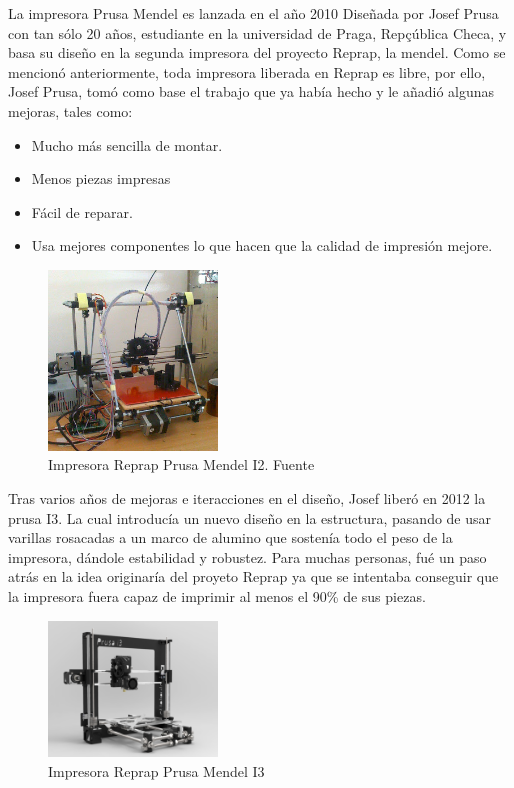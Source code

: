 La impresora Prusa Mendel es lanzada en el año 2010 Diseñada por Josef Prusa con tan sólo 20 años, estudiante en la universidad de Praga, Repçública Checa, y basa su diseño
en la segunda impresora del proyecto Reprap, la mendel. Como se mencionó anteriormente, toda impresora liberada en Reprap es libre, por ello, Josef Prusa, tomó como base el trabajo que ya había hecho y le añadió algunas mejoras, tales como:
\begin{itemize}
    \item Mucho más sencilla de montar.
    \item Menos piezas impresas
    \item Fácil de reparar.
    \item Usa mejores componentes lo que hacen que la calidad de impresión mejore.
\end{itemize}

\begin{figure}[H]
        \centering
        \includegraphics[width=0.4\textwidth]{images/prusa_i2.jpg}
        \caption{Impresora Reprap Prusa Mendel I2. Fuente \cite{prusai2}}
        \label{fig:estado_i2}
\end{figure}

Tras varios años de mejoras e iteracciones en el diseño, Josef liberó en 2012 la prusa I3. La cual introducía un nuevo diseño en la estructura, pasando de usar varillas rosacadas a un marco de alumino que sostenía todo el peso de la impresora, dándole estabilidad y robustez. Para muchas personas, fué un paso atrás en la idea originaría del proyeto Reprap ya que se intentaba conseguir que la impresora fuera capaz de imprimir al menos el 90\% de sus piezas.

\begin{figure}[H]
        \centering
        \includegraphics[width=0.4\textwidth]{images/prusa_i3.png}
        \caption{Impresora Reprap Prusa Mendel I3}
        \label{fig:estado_i3}
\end{figure}

